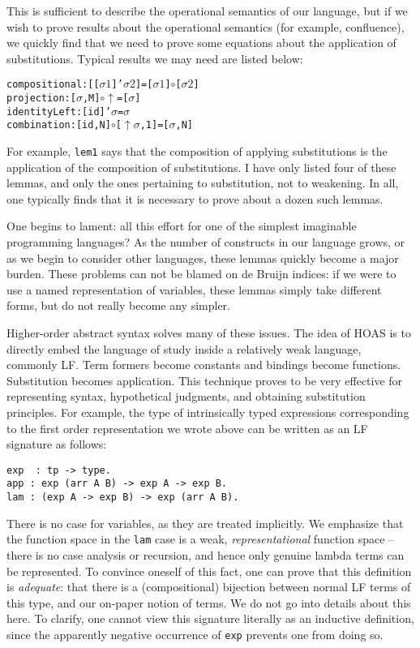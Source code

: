 \documentclass{article}
\begin{document}
This is sufficient to describe the operational semantics
of our language, but if we wish to prove results about the operational
semantics (for example, confluence), we quickly find that we need to
prove some equations about the application of substitutions. Typical
results we may need are listed below:

\begin{alltt}
compositional : [ [ \(\sigma1\) ]' \(\sigma2\) ] = [ \(\sigma1\) ] \(\circ\) [ \(\sigma2\) ]
projection    : [ \(\sigma\) , M ] \(\circ\) \(\uparrow\) = [ \(\sigma\) ]
identityLeft  : [ id ]' \(\sigma\) = \(\sigma\)
combination   : [ id , N ] \(\circ\) [ \(\uparrow\) \(\sigma\), 1 ] = [ \(\sigma\) , N ]
\end{alltt}

For example, \lstinline{lem1} says that the composition of applying
substitutions is the application of the composition of
substitutions. I have only listed four of these lemmas, and only the
ones pertaining to substitution, not to weakening. In all, one
typically finds that it is necessary to prove about a dozen such lemmas. 

One begins to lament: all this effort for one of the simplest imaginable programming
languages? As the number of constructs in our language grows, or as we
begin to consider other languages, these lemmas quickly become a major
burden. These problems can not be blamed on de Bruijn indices: if we were to use a named representation of variables, these
lemmas simply take different forms, but do not really become any
simpler.

Higher-order abstract syntax solves many of these issues. The 
idea of HOAS is to directly embed the language of study inside a
relatively weak language, commonly LF. Term formers become constants
and bindings become functions. Substitution becomes application. This
technique proves to be very effective for representing syntax,
hypothetical judgments, and obtaining substitution principles. For
example, the type of intrinsically typed expressions corresponding to
the first order representation we wrote above can be written as an LF
signature as follows: 

\begin{lstlisting}
exp  : tp -> type.
app : exp (arr A B) -> exp A -> exp B.
lam : (exp A -> exp B) -> exp (arr A B).
\end{lstlisting}

There is no case for variables, as they are
treated implicitly. We emphasize that the function space in the
\lstinline{lam} case is a weak, \emph{representational} function space
-- there is no case analysis or recursion, and hence only genuine
lambda terms can be represented. To convince oneself of this fact, one can prove that this definition is
\emph{adequate}: that there is a (compositional) bijection between normal LF terms of
this type, and our on-paper notion of terms. We do not go into details
about this here. To clarify, one cannot view this signature literally as an inductive
definition, since the apparently negative occurrence of
\lstinline{exp} prevents one from doing so.
\end{document}

